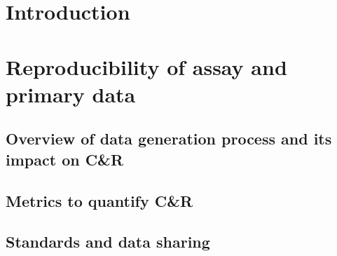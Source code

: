 \documentclass[11pt]{article}\usepackage{graphicx, color}
\begin{document}

\begin{abstract}
\end{abstract}

\section{Introduction}

\section{Reproducibility of assay and primary data}
\subsection{Overview of data generation process and its impact on C\&R}
\subsection{Metrics to quantify C\&R}
\subsection{Standards and data sharing}
\end{document}
